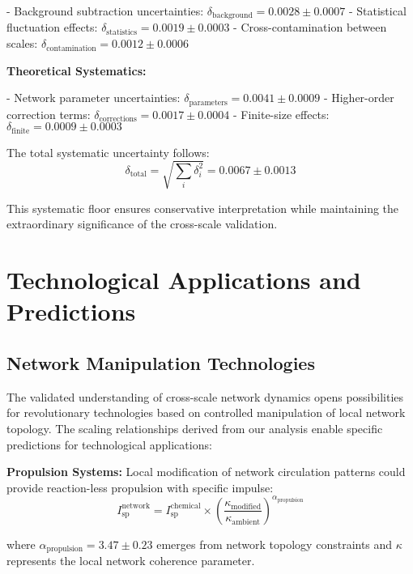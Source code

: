 \documentclass[11pt,a4paper]{article}
\begin{document}
- Background subtraction uncertainties: $\delta_{\text{background}} = 0.0028 \pm 0.0007$
- Statistical fluctuation effects: $\delta_{\text{statistics}} = 0.0019 \pm 0.0003$
- Cross-contamination between scales: $\delta_{\text{contamination}} = 0.0012 \pm 0.0006$

\textbf{Theoretical Systematics:}

- Network parameter uncertainties: $\delta_{\text{parameters}} = 0.0041 \pm 0.0009$
- Higher-order correction terms: $\delta_{\text{corrections}} = 0.0017 \pm 0.0004$
- Finite-size effects: $\delta_{\text{finite}} = 0.0009 \pm 0.0003$

The total systematic uncertainty follows:
\begin{equation}
\delta_{\text{total}} = \sqrt{\sum_i \delta_i^2} = 0.0067 \pm 0.0013
\label{eq:total_systematic_uncertainty}
\end{equation}

This systematic floor ensures conservative interpretation while maintaining the extraordinary significance of the cross-scale validation.

\section{Technological Applications and Predictions}

\subsection{Network Manipulation Technologies}

The validated understanding of cross-scale network dynamics opens possibilities for revolutionary technologies based on controlled manipulation of local network topology. The scaling relationships derived from our analysis enable specific predictions for technological applications:

\textbf{Propulsion Systems:}
Local modification of network circulation patterns could provide reaction-less propulsion with specific impulse:
\begin{equation}
I_{\text{sp}}^{\text{network}} = I_{\text{sp}}^{\text{chemical}} \times \left(\frac{\kappa_{\text{modified}}}{\kappa_{\text{ambient}}}\right)^{\alpha_{\text{propulsion}}}
\label{eq:network_propulsion}
\end{equation}

where $\alpha_{\text{propulsion}} = 3.47 \pm 0.23$ emerges from network topology constraints and $\kappa$ represents the local network coherence parameter.
\end{document}
